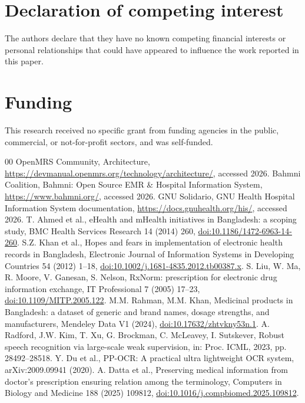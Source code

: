 \documentclass[preprint,12pt,a4paper]{elsarticle}
\begin{document}
\section*{Declaration of competing interest}
The authors declare that they have no known competing financial interests or personal relationships that could have appeared to influence the work reported in this paper.

\section*{Funding}
This research received no specific grant from funding agencies in the public,
commercial, or not-for-profit sectors, and was self-funded.

\begin{thebibliography}{00}
 OpenMRS Community, Architecture, \url{https://devmanual.openmrs.org/technology/architecture/}, accessed 2026.
 Bahmni Coalition, Bahmni: Open Source EMR \& Hospital Information System, \url{https://www.bahmni.org/}, accessed 2026.
 GNU Solidario, GNU Health Hospital Information System documentation, \url{https://docs.gnuhealth.org/his/}, accessed 2026.
 T. Ahmed et al., eHealth and mHealth initiatives in Bangladesh: a scoping study, BMC Health Services Research 14 (2014) 260, \href{https://doi.org/10.1186/1472-6963-14-260}{doi:10.1186/1472-6963-14-260}.
 S.Z. Khan et al., Hopes and fears in implementation of electronic health records in Bangladesh, Electronic Journal of Information Systems in Developing Countries 54 (2012) 1--18, \href{https://doi.org/10.1002/j.1681-4835.2012.tb00387.x}{doi:10.1002/j.1681-4835.2012.tb00387.x}.
 S. Liu, W. Ma, R. Moore, V. Ganesan, S. Nelson, RxNorm: prescription for electronic drug information exchange, IT Professional 7 (2005) 17--23, \href{https://doi.org/10.1109/MITP.2005.122}{doi:10.1109/MITP.2005.122}.
 M.M. Rahman, M.M. Khan, Medicinal products in Bangladesh: a dataset of generic and brand names, dosage strengths, and manufacturers, Mendeley Data V1 (2024), \href{https://doi.org/10.17632/zhtvkny53n.1}{doi:10.17632/zhtvkny53n.1}.
 A. Radford, J.W. Kim, T. Xu, G. Brockman, C. McLeavey, I. Sutskever, Robust speech recognition via large-scale weak supervision, in: Proc. ICML, 2023, pp. 28492--28518.
 Y. Du et al., PP-OCR: A practical ultra lightweight OCR system, arXiv:2009.09941 (2020).
 A. Datta et al., Preserving medical information from doctor's prescription ensuring relation among the terminology, Computers in Biology and Medicine 188 (2025) 109812, \href{https://doi.org/10.1016/j.compbiomed.2025.109812}{doi:10.1016/j.compbiomed.2025.109812}.

\end{thebibliography}
\end{document}
